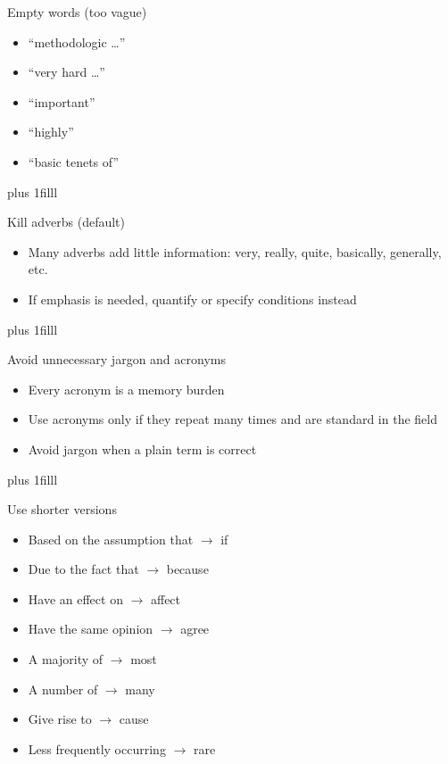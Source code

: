 \documentclass[aspectratio=169]{beamer}
\newcommand{\btVFill}{\vskip0pt plus 1filll}
\begin{document}
\begin{frame}{Empty words (too vague)}
  \begin{itemize}
    \item ``methodologic \ldots''
    \item ``very hard \ldots''
    \item ``important''
    \item ``highly''
    \item ``basic tenets of''
  \end{itemize}
\btVFill\end{frame}

\begin{frame}{Kill adverbs (default)}
  \begin{itemize}
    \item Many adverbs add little information: very, really, quite, basically, generally, etc.
    \item If emphasis is needed, quantify or specify conditions instead
  \end{itemize}
 \btVFill
\end{frame}

\begin{frame}{Avoid unnecessary jargon and acronyms}
  \begin{itemize}
    \item Every acronym is a memory burden
    \item Use acronyms only if they repeat many times and are standard in the field
    \item Avoid jargon when a plain term is correct
  \end{itemize}
\btVFill
\end{frame}

\begin{frame}{Use shorter versions}
  \begin{itemize}
    \item Based on the assumption that $\rightarrow$ if
    \item Due to the fact that $\rightarrow$ because
    \item Have an effect on $\rightarrow$ affect
    \item Have the same opinion $\rightarrow$ agree
    \item A majority of $\rightarrow$ most
    \item A number of $\rightarrow$ many
    \item Give rise to $\rightarrow$ cause
    \item Less frequently occurring $\rightarrow$ rare
  \end{itemize}
\end{frame}
\end{document}
